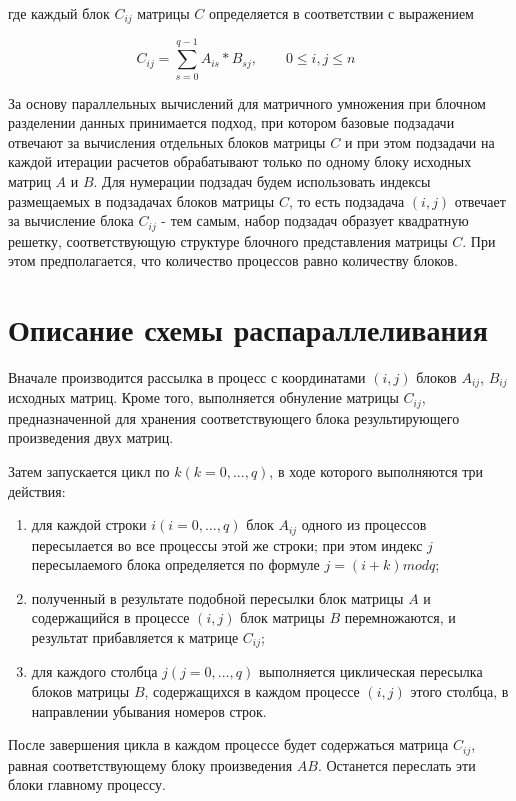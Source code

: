 \documentclass{report}
\begin{document}
где каждый блок $C_{ij}$ матрицы {\itshape $C$} определяется в соответствии с выражением
\par$$
    C_{ij} = \sum_{s=0}^{q-1} A_{is} * B_{sj},\qquad 0 \le i,j \le n \qquad
    $$
\par За основу параллельных вычислений для матричного умножения при блочном разделении данных принимается подход, при котором базовые подзадачи отвечают за вычисления отдельных блоков матрицы {\itshape $C$} и  при  этом  подзадачи на  каждой  итерации  расчетов обрабатывают только по одному блоку исходных матриц {\itshape $A$} и {\itshape $B$}. Для нумерации подзадач будем использовать индексы размещаемых в подзадачах блоков матрицы {\itshape $C$}, то есть подзадача {\itshape $(i,j)$} отвечает за вычисление блока {\itshape $C_{ij}$} - тем самым, набор подзадач образует квадратную решетку, соответствующую структуре блочного представления матрицы {\itshape $C$}. При этом предполагается, что количество процессов равно количеству блоков. 
\newpage

\section*{Описание схемы распараллеливания}
\par Вначале производится рассылка в процесс с координатами {\itshape $(i,j)$} блоков {\itshape $A_{ij}$}, {\itshape $B_{ij}$} исходных матриц. Кроме того, выполняется обнуление матрицы {\itshape $C_{ij}$}, предназначенной для хранения соответствующего блока результирующего произведения двух матриц. 
\par Затем запускается цикл по {\itshape $k (k = 0, ...,q)$}, в ходе которого выполняются три действия: 
\begin{enumerate} 
    \item для каждой строки {\itshape $i (i = 0, ..., q)$}  блок {\itshape $A_{ij}$} одного из процессов пересылается во все процессы этой же строки; при этом индекс {\itshape $j$} пересылаемого блока определяется по формуле {\itshape $j = (i + k) mod q$}; 
    \item полученный в результате подобной пересылки блок матрицы {\itshape $A$} и содержащийся в процессе {\itshape $(i,j)$} блок матрицы {\itshape $B$} перемножаются, и результат прибавляется к матрице {\itshape $C_{ij}$}; 
    \item для каждого столбца {\itshape $j (j = 0, ..., q)$} выполняется циклическая пересылка блоков матрицы {\itshape $B$}, содержащихся в каждом процессе {\itshape $(i,j)$} этого столбца, в направлении убывания номеров строк. 
    
\end{enumerate}
\par После завершения цикла в каждом процессе будет содержаться матрица {\itshape $C_{ij}$}, равная соответствующему блоку произведения {\itshape $AB$}. Останется переслать эти блоки главному процессу. 
\newpage
\end{document}
